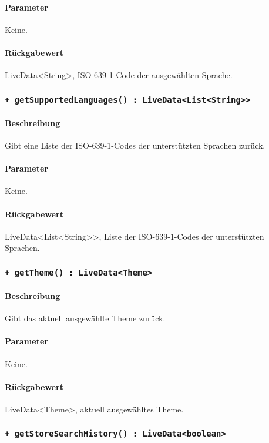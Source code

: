 \paragraph*{Parameter}
Keine.
\paragraph*{Rückgabewert}
LiveData<String>, ISO-639-1-Code der ausgewählten Sprache.

\subsubsection*{\texttt{+ getSupportedLanguages() : LiveData<List<String>>}}%
\paragraph*{Beschreibung}
Gibt eine Liste der ISO-639-1-Codes der unterstützten Sprachen zurück.
\paragraph*{Parameter}
Keine.
\paragraph*{Rückgabewert}
LiveData<List<String>>, Liste der ISO-639-1-Codes der unterstützten Sprachen.

\subsubsection*{\texttt{+ getTheme() : LiveData<Theme>}}%
\paragraph*{Beschreibung}
Gibt das aktuell ausgewählte Theme zurück.
\paragraph*{Parameter}
Keine.
\paragraph*{Rückgabewert}
LiveData<Theme>, aktuell ausgewähltes Theme.

\subsubsection*{\texttt{+ getStoreSearchHistory() : LiveData<boolean>}}%
